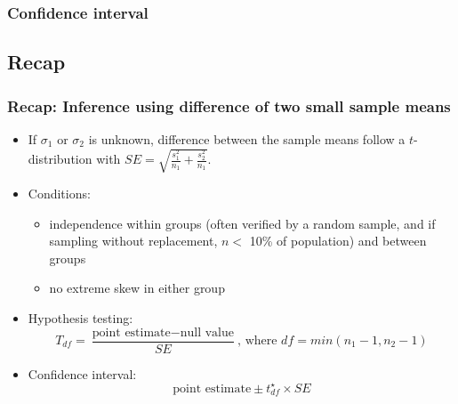 \documentclass[notes,11pt, aspectratio=169]{beamer}
\begin{document}

\begin{frame}
\frametitle{Confidence interval}


\pause


\end{frame}


\subsection{Recap}


\begin{frame}
\frametitle{Recap: Inference using difference of two small sample means}

\begin{itemize}

\item If $\sigma_1$ or $\sigma_2$ is unknown, difference between the sample means follow a $t$-distribution with $SE = \sqrt{ \frac{s_1^2}{n_1} + \frac{s_2^2}{n_1} }$.

\pause

\item Conditions: 
\begin{itemize}
\item independence within groups (often verified by a random sample, and if sampling without replacement, $n < $ 10\% of population) and between groups
\item no extreme skew in either group
\end{itemize}

\pause

\item Hypothesis testing: 
\[ T_{df} = \frac{\text{point estimate} - \text{null value}}{SE}\text{, where }df = min(n_1 - 1, n_2 - 1) \]

\pause

\item Confidence interval:
\[ \text{point estimate} \pm t_{df}^\star \times SE \]

\end{itemize}

\end{frame}
\end{document}
